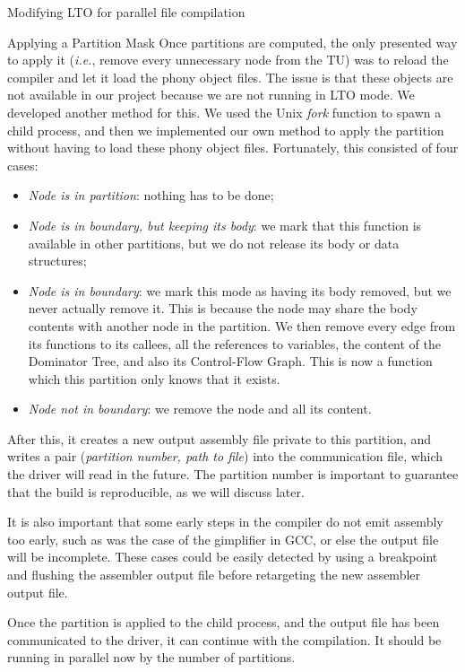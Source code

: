 \begin{section}{Modifying LTO for parallel file compilation}
\begin{subsection}{Applying a Partition Mask}
Once partitions are computed, the only presented way to apply it
(\textit{i.e.}, remove every unnecessary node from the TU) was to reload the
compiler and let it load the phony object files. The issue is that these
objects are not available in our project because we are not running in LTO
mode. We developed another method for this.
We used the Unix \textit{fork} function to spawn a child process, and then
we implemented our own method to apply the partition without having to load
these phony object files. Fortunately, this consisted
of four cases:
\begin{itemize}
	\item \textit{Node is in partition}: nothing has to be done;
	\item \textit{Node is in boundary, but keeping its body}: we mark that this function
	is available in other partitions, but we do not release its body or
	data structures;
	\item \textit{Node is in boundary}: we mark this mode as having its body removed,
	but we never actually remove it. This is because the node may share the
	body contents with another node in the partition. We then remove
	every edge from its functions to its callees, all the references to variables,
	the content of the Dominator Tree, and also its Control-Flow Graph. This
	is now a function which this partition only knows that it exists.
	\item \textit{Node not in boundary}: we remove the node and all its content.
\end{itemize}

After this, it creates a new output assembly file private to
this partition, and writes a pair (\textit{partition number, path to file}) into the
communication file, which the driver will read in the future. The partition
number is important to guarantee that the build is reproducible, as we will
discuss later.

It is also important that some early steps in the compiler do not emit
assembly too early, such as was the case of the gimplifier in GCC, or else the
output file will be incomplete. These cases could be easily detected by using
a breakpoint and flushing the assembler output file before retargeting the new
assembler output file.

Once the partition is applied to the child process, and the output file has
been communicated to the driver, it can continue with the compilation. It
should be running in parallel now by the number of partitions.


\end{subsection}
\end{section}
